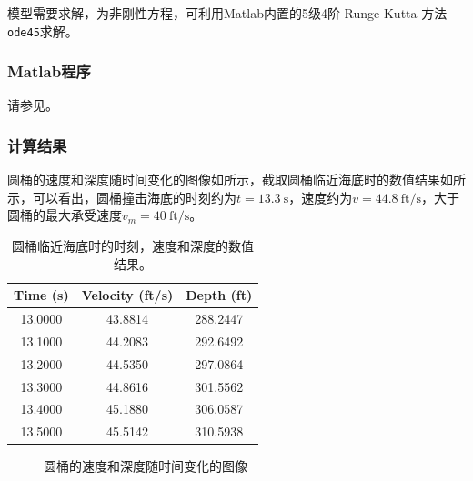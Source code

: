 \documentclass[12pt,a4paper]{article}
\begin{document}
模型需要求解，为非刚性方程，可利用Matlab内置的5级4阶 Runge-Kutta 方法\texttt{ode45}求解。

\subsubsection{Matlab程序}

请参见。

\subsubsection{计算结果}

圆桶的速度和深度随时间变化的图像如所示，截取圆桶临近海底时的数值结果如所示，可以看出，圆桶撞击海底的时刻约为$t=13.3\ \mathrm{s}$，速度约为$v=44.8\ \mathrm{ft/s}$，大于圆桶的最大承受速度$v_m = 40\ \mathrm{ft/s}$。

\begin{table}[t]
    \centering
    \caption{圆桶临近海底时的时刻，速度和深度的数值结果。}
    \label{tab:ex5_detail}
    \begin{tabular}{ccc}
        \toprule
        Time (s) & Velocity (ft/s) & Depth (ft)\tabularnewline
        \midrule
        13.0000 & 43.8814 & 288.2447\tabularnewline
        13.1000 & 44.2083 & 292.6492\tabularnewline
        13.2000 & 44.5350 & 297.0864\tabularnewline
        13.3000 & 44.8616 & 301.5562\tabularnewline
        13.4000 & 45.1880 & 306.0587\tabularnewline
        13.5000 & 45.5142 & 310.5938\tabularnewline
        \bottomrule
    \end{tabular}
\end{table}

\begin{figure}[t]
    \centering
    \caption{圆桶的速度和深度随时间变化的图像}
    \label{fig:ex5_result}
\end{figure}
\end{document}
